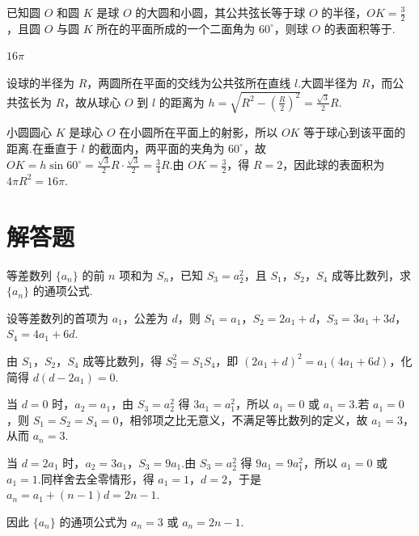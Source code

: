 \begin{problem}
已知圆 \(O\) 和圆 \(K\) 是球 \(O\) 的大圆和小圆，其公共弦长等于球 \(O\) 的半径，\(OK=\frac{3}{2}\)，且圆 \(O\) 与圆 \(K\) 所在的平面所成的一个二面角为 \(60^{\circ}\)，则球 \(O\) 的表面积等于\fillinblank{}.
\end{problem}

\begin{answer}
\(16\pi\)
\end{answer}

\begin{solution}
设球的半径为 \(R\)，两圆所在平面的交线为公共弦所在直线 \(l\).大圆半径为 \(R\)，而公共弦长为 \(R\)，故从球心 \(O\) 到 \(l\) 的距离为 \(h=\sqrt{R^2-\left(\frac{R}{2}\right)^2}=\frac{\sqrt3}{2}R\).

小圆圆心 \(K\) 是球心 \(O\) 在小圆所在平面上的射影，所以 \(OK\) 等于球心到该平面的距离.在垂直于 \(l\) 的截面内，两平面的夹角为 \(60^{\circ}\)，故 \(OK=h\sin60^{\circ}=\frac{\sqrt3}{2}R\cdot\frac{\sqrt3}{2}=\frac{3}{4}R\).由 \(OK=\frac{3}{2}\)，得 \(R=2\)，因此球的表面积为 \(4\pi R^2=16\pi\).
\end{solution}

\section{解答题}

\begin{problem}
等差数列 \(\{a_n\}\) 的前 \(n\) 项和为 \(S_n\)，已知 \(S_3=a_2^2\)，且 \(S_1\)，\(S_2\)，\(S_4\) 成等比数列，求 \(\{a_n\}\) 的通项公式.
\end{problem}

\begin{solution}
设等差数列的首项为 \(a_1\)，公差为 \(d\)，则 \(S_1=a_1\)，\(S_2=2a_1+d\)，\(S_3=3a_1+3d\)，\(S_4=4a_1+6d\).

由 \(S_1\)，\(S_2\)，\(S_4\) 成等比数列，得 \(S_2^2=S_1S_4\)，即 \((2a_1+d)^2=a_1(4a_1+6d)\)，化简得 \(d(d-2a_1)=0\).

当 \(d=0\) 时，\(a_2=a_1\)，由 \(S_3=a_2^2\) 得 \(3a_1=a_1^2\)，所以 \(a_1=0\) 或 \(a_1=3\).若 \(a_1=0\)，则 \(S_1=S_2=S_4=0\)，相邻项之比无意义，不满足等比数列的定义，故 \(a_1=3\)，从而 \(a_n=3\).

当 \(d=2a_1\) 时，\(a_2=3a_1\)，\(S_3=9a_1\).由 \(S_3=a_2^2\) 得 \(9a_1=9a_1^2\)，所以 \(a_1=0\) 或 \(a_1=1\).同样舍去全零情形，得 \(a_1=1\)，\(d=2\)，于是 \(a_n=a_1+(n-1)d=2n-1\).

因此 \(\{a_n\}\) 的通项公式为 \(a_n=3\) 或 \(a_n=2n-1\).
\end{solution}

